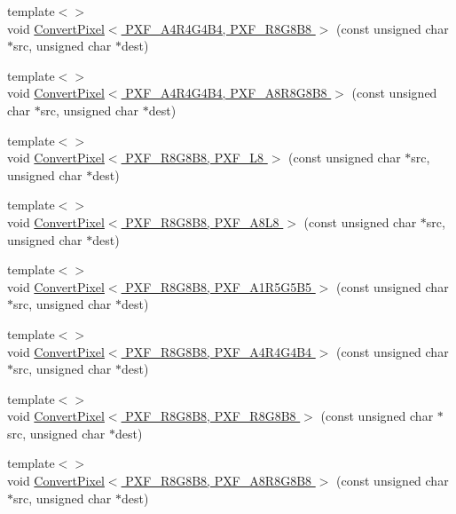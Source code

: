 \begin{DoxyCompactItemize}
{\footnotesize template$<$$>$ }\\void \hyperlink{_convert_pixel_8inl_a75ceab650b655cd39070466918bf8b1a}{Convert\-Pixel$<$ P\-X\-F\-\_\-\-A4\-R4\-G4\-B4, P\-X\-F\-\_\-\-R8\-G8\-B8 $>$} (const unsigned char $\ast$src, unsigned char $\ast$dest)
\item 
{\footnotesize template$<$$>$ }\\void \hyperlink{_convert_pixel_8inl_a41e17a0867d87828ed1d5705ccd90293}{Convert\-Pixel$<$ P\-X\-F\-\_\-\-A4\-R4\-G4\-B4, P\-X\-F\-\_\-\-A8\-R8\-G8\-B8 $>$} (const unsigned char $\ast$src, unsigned char $\ast$dest)
\item 
{\footnotesize template$<$$>$ }\\void \hyperlink{_convert_pixel_8inl_a9407a2cb0eec9cf3f9fa6fad051219fd}{Convert\-Pixel$<$ P\-X\-F\-\_\-\-R8\-G8\-B8, P\-X\-F\-\_\-\-L8 $>$} (const unsigned char $\ast$src, unsigned char $\ast$dest)
\item 
{\footnotesize template$<$$>$ }\\void \hyperlink{_convert_pixel_8inl_a3aa0d709692fbe2b99db5f3ef803d369}{Convert\-Pixel$<$ P\-X\-F\-\_\-\-R8\-G8\-B8, P\-X\-F\-\_\-\-A8\-L8 $>$} (const unsigned char $\ast$src, unsigned char $\ast$dest)
\item 
{\footnotesize template$<$$>$ }\\void \hyperlink{_convert_pixel_8inl_a2afd6cba518e0ff2bb2c1315faa2f835}{Convert\-Pixel$<$ P\-X\-F\-\_\-\-R8\-G8\-B8, P\-X\-F\-\_\-\-A1\-R5\-G5\-B5 $>$} (const unsigned char $\ast$src, unsigned char $\ast$dest)
\item 
{\footnotesize template$<$$>$ }\\void \hyperlink{_convert_pixel_8inl_a03961d827bf07c392d43082b616303f8}{Convert\-Pixel$<$ P\-X\-F\-\_\-\-R8\-G8\-B8, P\-X\-F\-\_\-\-A4\-R4\-G4\-B4 $>$} (const unsigned char $\ast$src, unsigned char $\ast$dest)
\item 
{\footnotesize template$<$$>$ }\\void \hyperlink{_convert_pixel_8inl_a6715830f488a09bbe4cfd7343843ffc5}{Convert\-Pixel$<$ P\-X\-F\-\_\-\-R8\-G8\-B8, P\-X\-F\-\_\-\-R8\-G8\-B8 $>$} (const unsigned char $\ast$src, unsigned char $\ast$dest)
\item 
{\footnotesize template$<$$>$ }\\void \hyperlink{_convert_pixel_8inl_ae32d8e6b9ece53522851db0e9bd8f6e7}{Convert\-Pixel$<$ P\-X\-F\-\_\-\-R8\-G8\-B8, P\-X\-F\-\_\-\-A8\-R8\-G8\-B8 $>$} (const unsigned char $\ast$src, unsigned char $\ast$dest)
\item 

\end{DoxyCompactItemize}
